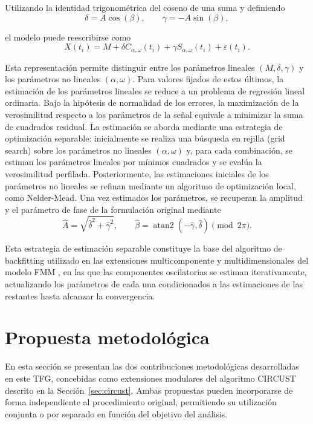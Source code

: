 \documentclass[12pt, a4paper]{report}
\begin{document}
Utilizando la identidad trigonométrica del coseno de una suma y definiendo
\[
\delta=A\cos(\beta),\qquad \gamma=-A\sin(\beta),
\]

el modelo puede reescribirse como
\[
X(t_i)=M+\delta C_{\alpha,\omega}(t_i)
+\gamma S_{\alpha,\omega}(t_i)+\varepsilon(t_i).
\]

Esta representación permite distinguir entre los parámetros lineales \((M,\delta,\gamma)\) y los parámetros no lineales \((\alpha,\omega)\). Para valores fijados de estos últimos, la estimación de los parámetros lineales se reduce a un problema de regresión lineal ordinaria.
Bajo la hipótesis de normalidad de los errores, la maximización de la verosimilitud respecto a los parámetros de la señal equivale a minimizar la suma de cuadrados residual. La estimación se aborda mediante una estrategia de optimización separable: inicialmente se realiza una búsqueda en rejilla (grid search) sobre los parámetros no lineales \((\alpha,\omega)\) y, para cada combinación, se estiman los parámetros lineales por mínimos cuadrados y se evalúa la verosimilitud perfilada. Posteriormente, las estimaciones iniciales de los parámetros no lineales se refinan mediante un algoritmo de optimización local, como Nelder-Mead.
Una vez estimados los parámetros, se recuperan la amplitud y el parámetro de fase de la formulación original mediante
\[
\widehat A=\sqrt{\widehat\delta^2+\widehat\gamma^2},
\qquad
\widehat\beta=\operatorname{atan2}(-\widehat\gamma,\widehat\delta)
\pmod{2\pi}.
\]

Esta estrategia de estimación separable constituye la base del algoritmo de backfitting utilizado en las extensiones multicomponente y multidimensionales del modelo FMM \cite{fmmAlgorithm, fernandez2022fmm}, en las que las componentes oscilatorias se estiman iterativamente, actualizando los parámetros de cada una condicionados a las estimaciones de las restantes hasta alcanzar la convergencia.

\section{Propuesta metodológica}

En esta sección se presentan las dos contribuciones metodológicas desarrolladas en este TFG, concebidas como extensiones modulares del algoritmo CIRCUST descrito en la Sección~\ref{sec:circust}. Ambas propuestas pueden incorporarse de forma independiente al procedimiento original, permitiendo su utilización conjunta o por separado en función del objetivo del análisis.
\end{document}
